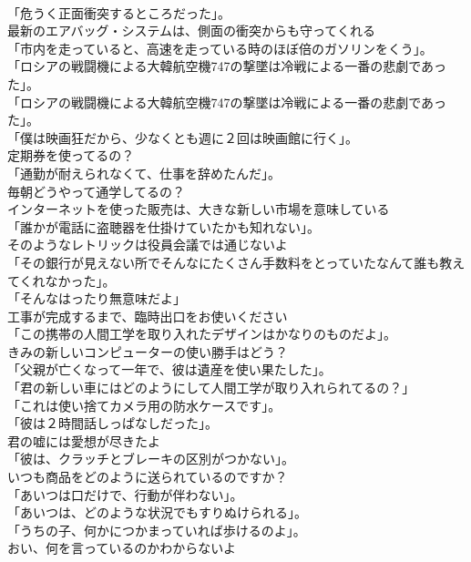 \documentclass[8pt]{extreport}
\begin{document}
\begin{CJK}{UTF8}{min}
\\	「危うく正面衝突するところだった」。	
\\	最新のエアバッグ・システムは、側面の衝突からも守ってくれる	
\\	「市内を走っていると、高速を走っている時のほぼ倍のガソリンをくう」。	
\\	「ロシアの戦闘機による大韓航空機747の撃墜は冷戦による一番の悲劇であった」。	
\\	「ロシアの戦闘機による大韓航空機747の撃墜は冷戦による一番の悲劇であった」。 
\\	「僕は映画狂だから、少なくとも週に２回は映画館に行く」。	
\\	定期券を使ってるの？	
\\	「通勤が耐えられなくて、仕事を辞めたんだ」。	
\\	毎朝どうやって通学してるの？	
\\	インターネットを使った販売は、大きな新しい市場を意味している	
\\	「誰かが電話に盗聴器を仕掛けていたかも知れない」。	
\\	そのようなレトリックは役員会議では通じないよ	
\\	「その銀行が見えない所でそんなにたくさん手数料をとっていたなんて誰も教えてくれなかった」。	
\\	「そんなはったり無意味だよ」	
\\	工事が完成するまで、臨時出口をお使いください	
\\	「この携帯の人間工学を取り入れたデザインはかなりのものだよ」。	
\\	きみの新しいコンピューターの使い勝手はどう？	
\\	「父親が亡くなって一年で、彼は遺産を使い果たした」。	
\\	「君の新しい車にはどのようにして人間工学が取り入れられてるの？」	
\\	「これは使い捨てカメラ用の防水ケースです」。	
\\	「彼は２時間話しっぱなしだった」。	
\\	君の嘘には愛想が尽きたよ	
\\	「彼は、クラッチとブレーキの区別がつかない」。	
\\	いつも商品をどのように送られているのですか？	
\\	「あいつは口だけで、行動が伴わない」。	
\\	「あいつは、どのような状況でもすりぬけられる」。	
\\	「うちの子、何かにつかまっていれば歩けるのよ」。	
\\	おい、何を言っているのかわからないよ	

\end{CJK}
\end{document}
